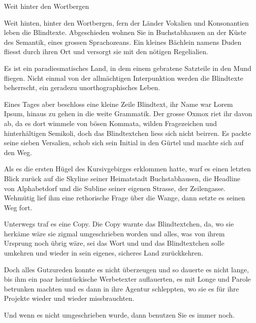 Weit hinter den Wortbergen

Weit hinten, hinter den Wortbergen, fern der Länder Vokalien und Konsonantien leben die Blindtexte. Abgeschieden wohnen Sie in Buchstabhausen an der Küste des Semantik, eines grossen Sprachozeans. Ein kleines Bächlein namens Duden fliesst durch ihren Ort und versorgt sie mit den nötigen Regelialien.

Es ist ein paradiesmatisches Land, in dem einem gebratene Satzteile in den Mund fliegen. Nicht einmal von der allmächtigen Interpunktion werden die Blindtexte beherrscht, ein geradezu unorthographisches Leben.

Eines Tages aber beschloss eine kleine Zeile Blindtext, ihr Name war Lorem Ipsum, hinaus zu gehen in die weite Grammatik. Der grosse Oxmox riet ihr davon ab, da es dort wimmele von bösen Kommata, wilden Fragezeichen und hinterhältigen Semikoli, doch das Blindtextchen liess sich nicht beirren. Es packte seine sieben Versalien, schob sich sein Initial in den Gürtel und machte sich auf den Weg.

Als es die ersten Hügel des Kursivgebirges erklommen hatte, warf es einen letzten Blick zurück auf die Skyline seiner Heimatstadt Buchstabhausen, die Headline von Alphabetdorf und die Subline seiner eigenen Strasse, der Zeilengasse. Wehmütig lief ihm eine rethorische Frage über die Wange, dann setzte es seinen Weg fort.

Unterwegs traf es eine Copy. Die Copy warnte das Blindtextchen, da, wo sie herkäme wäre sie zigmal umgeschrieben worden und alles, was von ihrem Ursprung noch übrig wäre, sei das Wort und und das Blindtextchen solle umkehren und wieder in sein eigenes, sicheres Land zurückkehren.

Doch alles Gutzureden konnte es nicht überzeugen und so dauerte es nicht lange, bis ihm ein paar heimtückische Werbetexter auflauerten, es mit Longe und Parole betrunken machten und es dann in ihre Agentur schleppten, wo sie es für ihre Projekte wieder und wieder missbrauchten.

Und wenn es nicht umgeschrieben wurde, dann benutzen Sie es immer noch.
